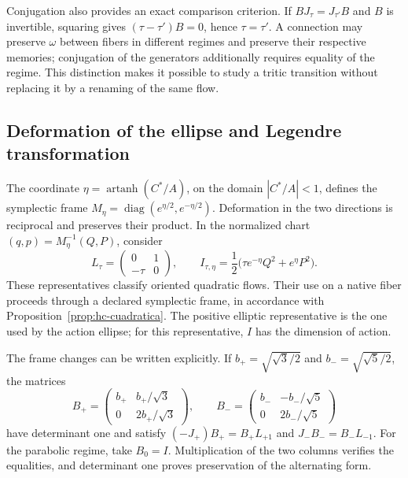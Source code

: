 Conjugation also provides an exact comparison criterion.
If \(BJ_\tau=J_{\tau'}B\) and \(B\) is invertible, squaring
gives \((\tau-\tau')B=0\), hence \(\tau=\tau'\). A connection may
preserve \(\omega\) between fibers in different regimes and preserve
their respective memories; conjugation of the generators additionally requires
equality of the regime. This distinction makes it possible to study a
tritic transition without replacing it by a renaming of the same flow.

\subsection{Deformation of the ellipse and Legendre transformation}

The coordinate \(\eta=\operatorname{artanh}(C^*/A)\), on the domain
\(|C^*/A|<1\), defines the symplectic frame
\(M_\eta=\operatorname{diag}(e^{\eta/2},e^{-\eta/2})\).
Deformation in the two directions is reciprocal and preserves their product.
In the normalized chart \((q,p)=M_\eta^{-1}(Q,P)\), consider
\[
 L_\tau=\begin{pmatrix}0&1\\-\tau&0\end{pmatrix},\qquad
 I_{\tau,\eta}=\frac12\bigl(\tau e^{-\eta}Q^2+e^\eta P^2\bigr).
\]
These representatives classify oriented quadratic flows. Their use
on a native fiber proceeds through a declared symplectic frame,
in accordance with Proposition~\ref{prop:hc-cuadratica}. The positive
elliptic representative is the one used by the action ellipse; for this representative, \(I\)
has the dimension of action.

The frame changes can be written explicitly. If
\(b_+=\sqrt{\sqrt3/2}\) and \(b_-=\sqrt{\sqrt5/2}\), the matrices
\[
 B_+=\begin{pmatrix}b_+&b_+/\sqrt3\\0&2b_+/\sqrt3\end{pmatrix},
 \qquad
 B_-=\begin{pmatrix}b_-&-b_-/\sqrt5\\0&2b_-/\sqrt5\end{pmatrix}
\]
have determinant one and satisfy
\( (-J_+)B_+=B_+L_{+1}\) and
\(J_-B_-=B_-L_{-1}\). For the parabolic regime, take
\(B_0=I\). Multiplication of the two columns verifies the
equalities, and determinant one proves preservation of the alternating
form.

